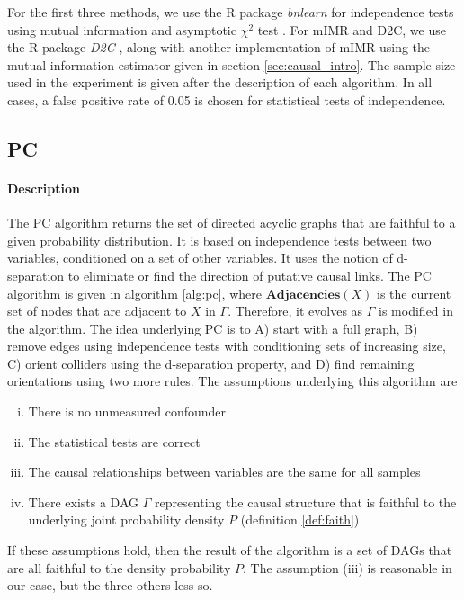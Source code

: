 For the first three methods, we use the R package \emph{bnlearn}
\parencite{scutari2009learning} for independence tests using mutual information
and asymptotic $\chi^2$ test \parencite{good2013permutation}. For mIMR and D2C,
we use the R package \emph{D2C} \parencite{bontempi2015dependency}, along with
another implementation of mIMR using the mutual information estimator given in
section \ref{sec:causal_intro}. The sample size used in the experiment is given
after the description of each algorithm. In all cases, a false positive rate of
0.05 is chosen for statistical tests of independence.

\subsection{PC}

\paragraph{Description} The PC algorithm \parencite{spirtes1991algorithm} returns
the set of directed acyclic graphs that are faithful to a given probability
distribution. It is based on independence tests between two variables,
conditioned on a set of other variables. It uses the notion of d-separation to
eliminate or find the direction of putative causal links. The PC algorithm is
given in algorithm \ref{alg:pc}, where $\textbf{Adjacencies}(X)$ is the current
set of nodes that are adjacent to $X$ in $\Gamma$. Therefore, it evolves as
$\Gamma$ is modified in the algorithm. The idea underlying PC is to A) start
with a full graph, B) remove edges using independence tests with conditioning
sets of increasing size, C) orient colliders using the d-separation property,
and D) find remaining orientations using two more rules. The assumptions
underlying this algorithm are

\begin{enumerate}[(i)]
    \item There is no unmeasured confounder
    \item The statistical tests are correct
    \item The causal relationships between variables are the same for all samples
    \item There exists a DAG $\Gamma$ representing the causal structure that is
    faithful to the underlying joint probability density $P$ (definition
    \ref{def:faith})
\end{enumerate}

If these assumptions hold, then the result of the algorithm is a set of DAGs
that are all faithful to the density probability $P$. The assumption (iii) is
reasonable in our case, but the three others less so.

